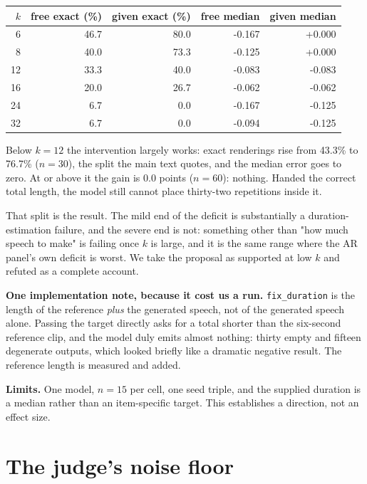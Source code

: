 \documentclass[11pt]{article}
\begin{document}
\begin{center}
\begin{tabular}{rrrrr}
\toprule
$k$ & free exact (\%) & given exact (\%) & free median & given median \\
\midrule
6 & 46.7 & 80.0 & -0.167 & +0.000 \\
8 & 40.0 & 73.3 & -0.125 & +0.000 \\
12 & 33.3 & 40.0 & -0.083 & -0.083 \\
16 & 20.0 & 26.7 & -0.062 & -0.062 \\
24 & 6.7 & 0.0 & -0.167 & -0.125 \\
32 & 6.7 & 0.0 & -0.094 & -0.125 \\
\bottomrule
\end{tabular}
\end{center}

Below $k=12$ the intervention largely works: exact renderings rise from
43.3\% to 76.7\% ($n=30$), the split the main text quotes, and the median
error goes to zero.
At or above it the gain is 0.0 points ($n=60$): nothing. Handed
the correct total length, the model still cannot place thirty-two repetitions
inside it.

That split is the result. The mild end of the deficit is substantially a
duration-estimation failure, and the severe end is not: something other than
"how much speech to make" is failing once $k$ is large, and it is the same range
where the AR panel's own deficit is worst. We take the proposal as supported at
low $k$ and refuted as a complete account.

\noindent\textbf{One implementation note, because it cost us a run.}
\texttt{fix\_duration} is the length of the reference \emph{plus} the generated speech,
not of the generated speech alone. Passing the target directly asks for a total
shorter than the six-second reference clip, and the model duly emits almost
nothing: thirty empty and fifteen degenerate outputs, which looked briefly
like a dramatic negative result. The reference length is measured and added.

\noindent\textbf{Limits.} One model, $n=15$ per cell, one seed triple, and the
supplied duration is a median rather than an item-specific target. This
establishes a direction, not an effect size.

\section{The judge's noise floor}
\label{sec:s14}
\end{document}

